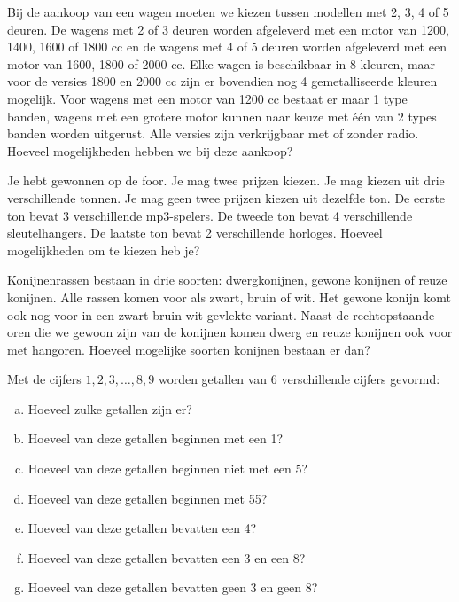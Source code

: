\documentclass[12pt,a4,twoside]{article}
\begin{document}
\begin{oefening}
Bij de aankoop van een wagen moeten we kiezen tussen modellen met 2, 3, 4 of 5 deuren. De wagens met 2 of 3 deuren worden afgeleverd met een motor van 1200, 1400, 1600 of 1800 cc en de wagens met 4 of 5 deuren worden afgeleverd met een motor van 1600, 1800 of 2000 cc. Elke wagen is beschikbaar in 8 kleuren, maar voor de versies 1800 en 2000 cc zijn er bovendien nog 4 gemetalliseerde kleuren mogelijk. Voor wagens met een motor van 1200 cc bestaat er maar 1 type banden, wagens met een grotere motor kunnen naar keuze met één van 2 types banden worden uitgerust. Alle versies zijn verkrijgbaar met of zonder radio. Hoeveel mogelijkheden hebben we bij deze aankoop?
\end{oefening}

\begin{oefening}
Je hebt gewonnen op de foor. Je mag twee prijzen kiezen. Je mag kiezen uit drie verschillende tonnen. Je mag geen twee prijzen kiezen uit dezelfde ton. De eerste ton bevat 3 verschillende mp3-spelers. De tweede ton bevat 4 verschillende sleutelhangers. De laatste ton bevat 2 verschillende horloges. Hoeveel mogelijkheden om te kiezen heb je?
\end{oefening}

\begin{oefening}
Konijnenrassen bestaan in drie soorten: dwergkonijnen, gewone konijnen of reuze konijnen. Alle rassen komen voor als zwart, bruin of wit. Het gewone konijn komt ook nog voor in een zwart-bruin-wit gevlekte variant. Naast de rechtopstaande oren die we gewoon zijn van de konijnen komen dwerg en reuze konijnen ook voor met hangoren. Hoeveel mogelijke soorten konijnen bestaan er dan?
\end{oefening}

\begin{oefening}
Met de cijfers $1, 2, 3, \ldots , 8, 9$ worden getallen van 6 verschillende cijfers gevormd:
\begin{enumerate}[(a)]
  \item Hoeveel zulke getallen zijn er?
  \item Hoeveel van deze getallen beginnen met een 1?
  \item Hoeveel van deze getallen beginnen niet met een 5?
  \item Hoeveel van deze getallen beginnen met 55?
  \item Hoeveel van deze getallen bevatten een 4?
  \item Hoeveel van deze getallen bevatten een 3 en een 8?
  \item Hoeveel van deze getallen bevatten geen 3 en geen 8?
\end{enumerate}
\end{oefening}
\end{document}
